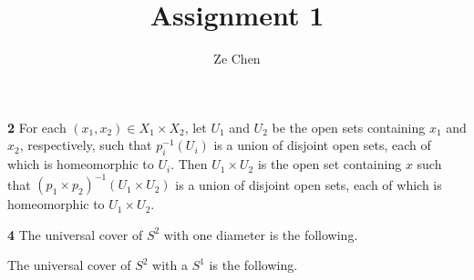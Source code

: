 \documentclass{article}
\title{Assignment 1}
\author{Ze Chen}
\makeatletter
\newcommand*{\shifttext}[1]{%
  \settowidth{\@tempdima}{#1}%
  \hspace{-\@tempdima}#1%
}
\newcommand{\plabel}[1]{%
\shifttext{\textbf{#1}\quad}%
}
\makeatother
\begin{document}
\maketitle

\plabel{2}%
For each $(x_1,x_2)\in X_1\times X_2$, let $U_1$ and $U_2$ be the open sets containing $x_1$ and $x_2$, respectively, such that $p_i^{-1}(U_i)$ is a union of disjoint open sets, each of which is homeomorphic to $U_i$.
Then $U_1\times U_2$ is the open set containing $x$ such that $(p_1\times p_2)^{-1}(U_1\times U_2)$ is a union of disjoint open sets, each of which is homeomorphic to $U_1 \times U_2$.

\plabel{4}%
The universal cover of $S^2$ with one diameter is the following.
\def\mydraw#1#2{
    \draw (#1,#2) circle (.5);
    \draw (#1-0.5,#2) to[bend right] (#1+0.5,#2);
    \draw[dotted] (#1-0.5,#2) to[bend left] (#1+0.5,#2);
}
\begin{center}
\end{center}
The universal cover of $S^2$ with a $S^1$ is the following.
\begin{center}
\end{center}
\end{document}
